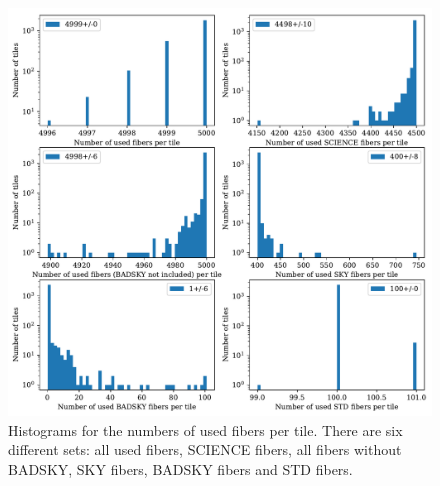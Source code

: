 \documentclass{article}
\begin{document}
\begin{figure}[!h]
\begin{center}
\begin{center}
\includegraphics[scale=0.6]{used_fibers.pdf}
\end{center}
\caption{
Histograms for the numbers of used fibers per tile. There are six different sets: all used fibers, SCIENCE fibers, all fibers without BADSKY, SKY fibers, BADSKY fibers and STD fibers. 
\label{fig:used_fibers}}
\end{center}
\end{figure}
\end{document}
